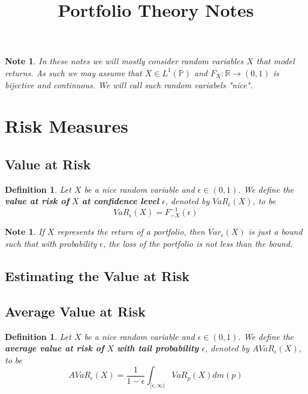 \documentclass[12pt]{amsart}
\newtheorem{defn}[thm]{Definition}
\newtheorem{note}[thm]{Note}
\newcommand{\ep}{\epsilon}
\newcommand{\R}{\mathbb{R}}
\renewcommand{\P}{\mathbb{P}}
\begin{document}
\title{Portfolio Theory Notes}
\maketitle

\tableofcontents

\begin{note}
In these notes we will mostly consider random variables $X$ that model returns. As such we may assume that $X \in L^1(\P)$ and $F_X:\R \rightarrow (0,1)$ is bijective and continuous. We will call such random variabels "nice".
\end{note}

\section{Risk Measures}

\subsection{Value at Risk}

\begin{defn}
Let $X$ be a nice random variable and $\ep \in (0,1)$. We define the \textbf{value at risk of } $X$ \textbf{at confidence level } $\ep$, denoted by $VaR_{\ep}(X)$, to be $$VaR_{\ep}(X) = F^{-1}_{-X}(\ep)$$
\end{defn}

\begin{note}
If $X$ represents the return of a portfolio, then $Var_{\ep}(X)$ is just a bound such that with probability $\ep$, the loss of the portfolio is not less than the bound.  
\end{note}

\subsection{Estimating the Value at Risk}

\subsection{Average Value at Risk}

 \begin{defn}
Let $X$ be a nice random variable and $\ep \in (0,1)$. We define the \textbf{average value at risk of } $X$ \textbf{with tail probability } $\ep$, denoted by $AVaR_{\ep}(X)$, to be $$AVaR_{\ep}(X) = \frac{1}{1-\ep}\int_{[\ep,\infty)}VaR_p(X)dm(p)$$
\end{defn}
\end{document}
